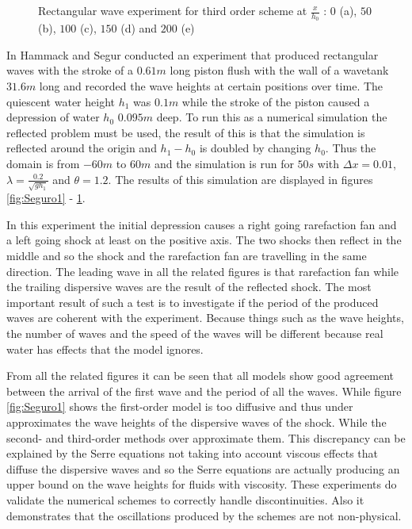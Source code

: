 \documentclass[SingleSpace,12pt]{Serre_ASCE}
\begin{document}
\begin{figure}[htb]
\caption{Rectangular wave experiment for third order scheme at $\frac{x}{h_0}$ : $0$ (a), $50$ (b), $100$ (c), $150$ (d) and $200$ (e)}
\label{fig:Seguro3}
\end{figure}
In \cite{Hammack-Segur-1978-337} Hammack and Segur conducted an experiment that produced rectangular waves with the stroke of a $0.61m$ long piston flush with the wall of a wavetank $31.6m$ long and recorded the wave heights at certain positions over time. The quiescent water height $h_1$ was $0.1m$ while the stroke of the piston caused a depression of water $h_0$ $0.095m$ deep. To run this as a numerical simulation the reflected problem must be used, the result of this is that the simulation is reflected around the origin and $h_1 - h_0$ is doubled by changing $h_0$. Thus the domain is from $-60m$ to $60m$ and the simulation is run for $50s$ with $\Delta x = 0.01$, $\lambda = \frac{0.2}{\sqrt{g h_1}}$ and $\theta = 1.2$. The results of this simulation are displayed in figures \ref{fig:Seguro1} - \ref{fig:Seguro3}.

In this experiment the initial depression causes a right going rarefaction fan and a left going shock at least on the positive axis. The two shocks then reflect in the middle and so the shock and the rarefaction fan are travelling in the same direction. The leading wave in all the related figures is that rarefaction fan while the trailing dispersive waves are the result of the reflected shock. The most important result of such a test is to investigate if the period of the produced waves are coherent with the experiment. Because things such as the wave heights, the number of waves and the speed of the waves will be different because real water has effects that the model ignores.   

From all the related figures it can be seen that all models show good agreement between the arrival of the first wave and the period of all the waves. While figure \ref{fig:Seguro1} shows the first-order model is too diffusive and thus under approximates the wave heights of the dispersive waves of the shock. While the second- and third-order methods over approximate them. This discrepancy can be explained by the Serre equations not taking into account viscous effects that diffuse the dispersive waves and so the Serre equations are actually producing an upper bound on the wave heights for fluids with viscosity. These experiments do validate the numerical schemes to correctly handle discontinuities. Also it demonstrates that the oscillations produced by the schemes are not non-physical.  
\end{document}
